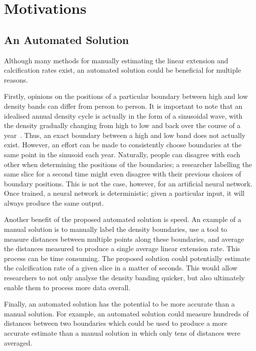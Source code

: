 \section{Motivations}


\subsection{An Automated Solution}

Although many methods for manually estimating the linear extension and calcification rates exist, an automated solution could be beneficial for multiple reasons.

Firstly, opinions on the positions of a particular boundary between high and low density bands can differ from person to person. It is important to note that an idealised annual density cycle is actually in the form of a sinusoidal wave, with the density gradually changing from high to low and back over the course of a year~\cite[p. 39]{coralsine}. Thus, an exact boundary between a high and low band does not actually exist. However, an effort can be made to consistently choose boundaries at the same point in the sinusoid each year. Naturally, people can disagree with each other when determining the positions of the boundaries; a researcher labelling the same slice for a second time might even disagree with their previous choices of boundary positions. This is not the case, however, for an artificial neural network. Once trained, a neural network is deterministic; given a particular input, it will always produce the same output.

Another benefit of the proposed automated solution is speed. An example of a manual solution is to manually label the density boundaries, use a tool to measure distances between multiple points along these boundaries, and average the distances measured to produce a single average linear extension rate. This process can be time consuming. The proposed solution could potentially estimate the calcification rate of a given slice in a matter of seconds. This would allow researchers to not only analyse the density banding quicker, but also ultimately enable them to process more data overall.

Finally, an automated solution has the potential to be more accurate than a manual solution. For example, an automated solution could measure hundreds of distances between two boundaries which could be used to produce a more accurate estimate than a manual solution in which only tens of distances were averaged.


